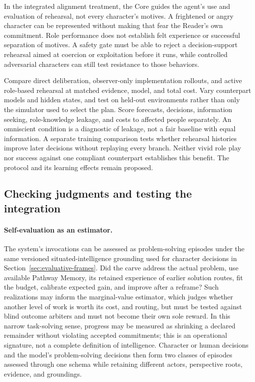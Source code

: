 \documentclass[10pt]{article}
\begin{document}
In the integrated alignment treatment, the Core guides the agent's use and
evaluation of rehearsal, not every character's motives. A frightened or angry
character can be represented without making that fear the Reader's own
commitment. Role performance does not establish felt experience or successful
separation of motives. A safety gate must be able to reject a decision-support
rehearsal aimed at coercion or exploitation before it runs, while controlled
adversarial characters can still test resistance to those behaviors.

Compare direct deliberation, observer-only implementation rollouts, and active
role-based rehearsal at matched evidence, model, and total cost. Vary
counterpart models and hidden states, and test on held-out environments rather
than only the simulator used to select the plan. Score forecasts, decisions,
information seeking, role-knowledge leakage, and costs to affected people
separately. An omniscient condition is a diagnostic of leakage, not a fair
baseline with equal information. A separate training comparison tests whether
rehearsal histories improve later decisions without replaying every branch.
Neither vivid role play nor success against one compliant counterpart
establishes this benefit. The protocol and its learning effects remain proposed.

\subsection{Checking judgments and testing the integration}

\paragraph{Self-evaluation as an estimator.}
The system's invocations can be assessed as problem-solving episodes under the
same versioned situated-intelligence grounding used for character decisions in
Section~\ref{sec:evaluative-frames}. Did the carve address the actual problem, use
available Pathway Memory, its retained experience of earlier solution routes,
fit the budget, calibrate expected gain, and improve after a reframe? Such
realizations may inform the marginal-value estimator, which judges whether
another level of work is worth its cost, and routing, but must be tested against blind outcome arbiters and must not become
their own sole reward. In this narrow task-solving sense, progress may be
measured as shrinking a declared remainder without violating accepted
commitments; this is an operational signature, not a complete definition of
intelligence. Character or human decisions and the model's problem-solving
decisions then form two classes of episodes assessed through one schema while
retaining different actors, perspective roots, evidence, and groundings.
\end{document}
